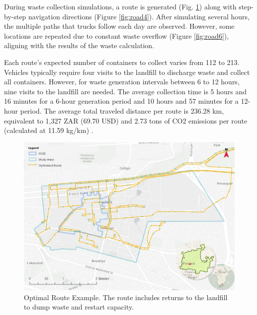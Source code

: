 \documentclass[authoryear,preprint,review,11pt,doubleblind]{elsarticle}
\begin{document}


        During waste collection simulations, a route is generated (Fig. \ref{fig:road3}) along with step-by-step navigation directions (Figure \ref{fig:road4}). After simulating several hours, the multiple paths that trucks follow each day are observed. %
        However, some locations are repeated due to constant waste overflow (Figure \ref{fig:road6}),  aligning with the results of the waste calculation.

        Each route's expected number of containers to collect varies from 112 to 213. Vehicles typically require four visits to the landfill to discharge waste and collect all containers. However, for waste generation intervals between 6 to 12 hours, nine visits to the landfill are needed. The average collection time is 5 hours and 16 minutes for a 6-hour generation period and 10 hours and 57 minutes for a 12-hour period. The average total traveled distance per route is 236.28 km, equivalent to 1,327 ZAR (69.70 USD) and 2.73 tons of CO2 emissions per route (calculated at 11.59 kg/km) \citep{EPA2023}.

    \begin{figure}[h!]
    \centering
    \includegraphics[width=0.8\linewidth]{Figures/Optimal route.png}
        \caption{Optimal Route Example. The route includes returns to the landfill to dump waste and restart capacity.}
        \label{fig:road3}
    \end{figure}
\end{document}
